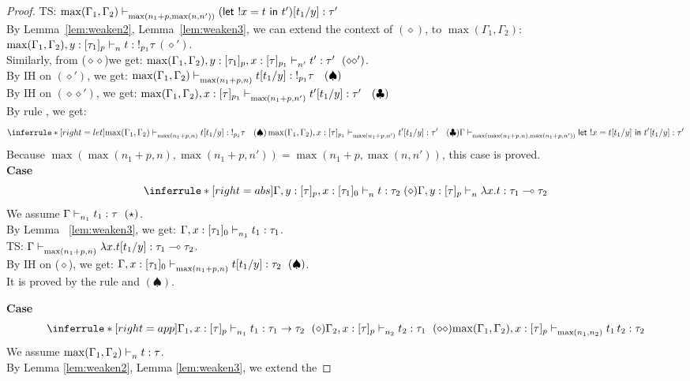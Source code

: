 \documentclass{article}
\begin{document}
\begin{proof}
   TS: $ \max(\Gamma_1,\Gamma_2) \mathrel{\vdash_{ \max( n_1 + p, \max(n,n') ) }^{} { (\mathrel{ \mathsf{let}\ {!x} = {t} \ \mathsf{in} \ {t'} } ) [t_1/y] } : { \tau' }} $\\
   By Lemma~\ref{lem:weaken2}, Lemma~\ref{lem:weaken3}, we can extend the context of $(\diamond)$, to $\max(\Gamma_1,\Gamma_2)$:\\
   $\max(\Gamma_1,\Gamma_2), y : [\tau_1]_{p} \mathrel{\vdash_{n}^{} {t} : {!_{p_1} \tau}}$$(\diamond')$.\\
   Similarly, from ($\diamond\diamond$)we get: $ \max(\Gamma_1,\Gamma_2), y : [\tau_1]_{p}, x: [\tau]_{p_1} \mathrel{\vdash_{n'}^{} {t'} : {\tau'}} ~(\diamond\diamond') $. \\
   By IH on $(\diamond')$, we get:
   $ \max(\Gamma_1,\Gamma_2) \jtype{\max(n_1+p, n)}{}{t[t_1/y]}{!_{p_1} \tau} \ \ (\spadesuit) $\\
    By IH on $(\diamond\diamond')$, we get:
   $ \max(\Gamma_1,\Gamma_2),x:[\tau]_{p_1} \mathrel{\vdash_{\max(n_1+p, n')}^{} {t'[t_1/y]} : { \tau'}} \ \  (\clubsuit ) $\\
   By rule , we get:
    \[
    \inferrule*[ right = let ]
   {\max(\Gamma_1,\Gamma_2) \jtype{\max(n_1+p, n)}{}{t[t_1/y]}{!_{p_1} \tau} \ \ (\spadesuit) \\ \max(\Gamma_1,\Gamma_2),x:[\tau]_{p_1} \jtype{\max(n_1+p, n')}{}{t'[t_1/y]}{ \tau'} \ \  (\clubsuit ) }
   { \Gamma \jtype{\max( \max(n_1+p, n)  ,\max(n_1+p, n'))}{}{\letx{!x}{t[t_1/y]}{t'[t_1/y]}}{\tau'}  }
   \]
   Because $\max( \max(n_1+p, n)  ,\max(n_1+p, n')) = \max( n_1 + p, \max(n,n') ) $, this case is proved.\\
   
    \noindent \textbf{Case} 
   \[
      \inferrule*[right = abs]
   {\Gamma, y:[\tau]_p, x: [\tau_1]_{0} \jtype{n}{}{t}{\tau_2} (\diamond)}
   { \Gamma, y: [\tau]_p \jtype{n}{}{\abs{x}{t}}{\tau_1 \multimap \tau_2}  }
   \]
   We assume $ \Gamma \jtype{n_1}{}{t_1}{\tau}~(\star) $.\\
   By Lemma ~\ref{lem:weaken3}, we get: $ \Gamma, x:[\tau_1]_0  \mathrel{\vdash_{n_1}^{} {t_1} : {\tau_1}}$.\\
   TS: $ \Gamma \mathrel{\vdash_{\max(n_1+p , n)}^{} {\mathrel { \lambda {x} . {t[t_1/y]} }} : {\tau_1 \multimap \tau_2 }} $.\\
   By IH on ($\diamond$), we get: $ \Gamma, x:[\tau_1]_0 \mathrel{\vdash_{\max(n_1+p,n )}^{} {t[t_1/y]} : {\tau_2}}~(\spadesuit) $.\\ 
   It is proved by the rule  and $(\spadesuit)$.
   
   \noindent \textbf{Case} 
   \[
    \inferrule*[ right = app ]
   {\Gamma_1, x:[\tau]_p \jtype{n_1}{}{t_1}{\tau_1 \rightarrow \tau_2}~(\diamond) \\ \Gamma_2, x:[\tau]_p \jtype{n_2}{}{t_2}{\tau_1}~(\diamond\diamond) }
   { \max(\Gamma_1,\Gamma_2),x : [\tau]_p \jtype{\max(n_1,n_2)}{}{\app{t_1}{t_2}}{\tau_2}  }
   \]
   We assume $ \max(\Gamma_1,\Gamma_2) \mathrel{\vdash_{n}^{} {t} : {\tau}} $.\\
   By Lemma \ref{lem:weaken2}, Lemma \ref{lem:weaken3}, we extend the 
   

\end{proof}
\end{document}
